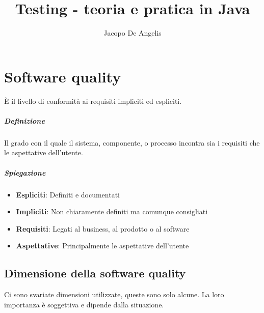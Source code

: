 \documentclass[11pt,a4paper]{book}
\begin{document}
\title{Testing - teoria e pratica in Java}
\author{Jacopo De Angelis}
\maketitle

\pagebreak
\tableofcontents
\pagebreak

\chapter{Software quality}
È il livello di conformità ai requisiti impliciti ed espliciti.

\paragraph{Definizione}
Il grado con il quale il sistema, componente, o processo incontra sia i requisiti che le aspettative dell'utente.

\paragraph{Spiegazione}
\begin{itemize}
	\item \textbf{Espliciti}: Definiti e documentati
	\item \textbf{Impliciti}: Non chiaramente definiti ma comunque consigliati
	\item \textbf{Requisiti}: Legati al business, al prodotto o al software
	\item \textbf{Aspettative}: Principalmente le aspettative dell'utente
\end{itemize}

\section{Dimensione della software quality}
Ci sono svariate dimensioni utilizzate, queste sono solo alcune. La loro importanza è soggettiva e dipende dalla situazione.
\end{document}
